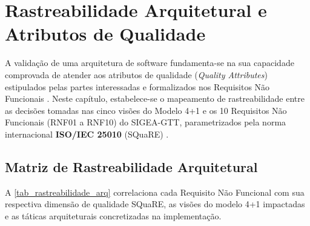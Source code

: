 \chapter{Rastreabilidade Arquitetural e Atributos de Qualidade}
\label{cap_atributos_qualidade}

A validação de uma arquitetura de software fundamenta-se na sua capacidade comprovada de atender aos atributos de qualidade (\textit{Quality Attributes}) estipulados pelas partes interessadas e formalizados nos Requisitos Não Funcionais \cite{bass2021,richards2020}. Neste capítulo, estabelece-se o mapeamento de rastreabilidade entre as decisões tomadas nas cinco visões do Modelo 4+1 e os 10 Requisitos Não Funcionais (RNF01 a RNF10) do SIGEA-GTT, parametrizados pela norma internacional \textbf{ISO/IEC 25010} (SQuaRE) \cite{iso25010}.

\section{Matriz de Rastreabilidade Arquitetural}
\label{sec_matriz_rastreabilidade_arq}

A \autoref{tab_rastreabilidade_arq} correlaciona cada Requisito Não Funcional com sua respectiva dimensão de qualidade SQuaRE, as visões do modelo 4+1 impactadas e as táticas arquiteturais concretizadas na implementação.


